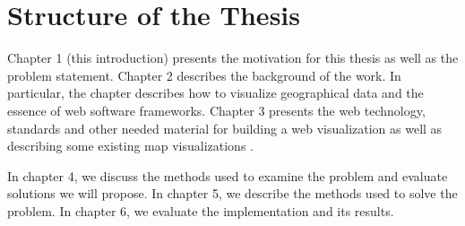 

\section{Structure of the Thesis}
\label{section:structure} 

Chapter 1 (this introduction) presents the motivation for this thesis as well as the problem statement. Chapter 2 describes the background of the work. In particular, the chapter describes how to visualize geographical data and the essence of web software frameworks. Chapter 3 presents the web technology, standards and other needed material for building a web visualization as well as describing some existing map visualizations .

In chapter 4, we discuss the methods used to examine the problem and evaluate solutions we will propose. In chapter 5, we describe the methods used to solve the problem. In chapter 6, we evaluate the implementation and its results. 



